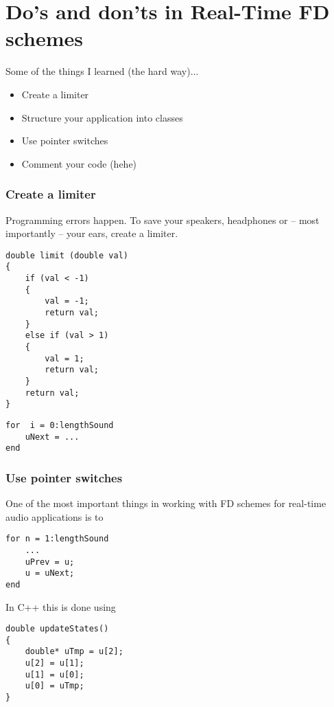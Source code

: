 \section{Do's and don'ts in Real-Time FD schemes}
Some of the things I learned (the hard way)...
\begin{itemize}
    \item Create a limiter
    \item Structure your application into classes 
    \item Use pointer switches
    \item Comment your code (hehe)
\end{itemize}

\subsubsection{Create a limiter}
Programming errors happen. To save your speakers, headphones or -- most importantly -- your ears, create a limiter. 

\setlstCpp
\begin{lstlisting}
double limit (double val)
{
    if (val < -1)
    {
        val = -1;
        return val;
    }
    else if (val > 1)
    {
        val = 1;
        return val;
    }
    return val;
}
\end{lstlisting}

\setlstMAT
\begin{lstlisting}
for  i = 0:lengthSound
    uNext = ...
end
\end{lstlisting}

\subsubsection{Use pointer switches}
One of the most important things in working with FD schemes for real-time audio applications is to 

\setlstMAT
\begin{lstlisting}
for n = 1:lengthSound
    ...
    uPrev = u;
    u = uNext;
end
\end{lstlisting}

In C++ this is done using
\setlstCpp
\begin{lstlisting}
double updateStates()
{
    double* uTmp = u[2];
    u[2] = u[1];
    u[1] = u[0];
    u[0] = uTmp;
}
\end{lstlisting}